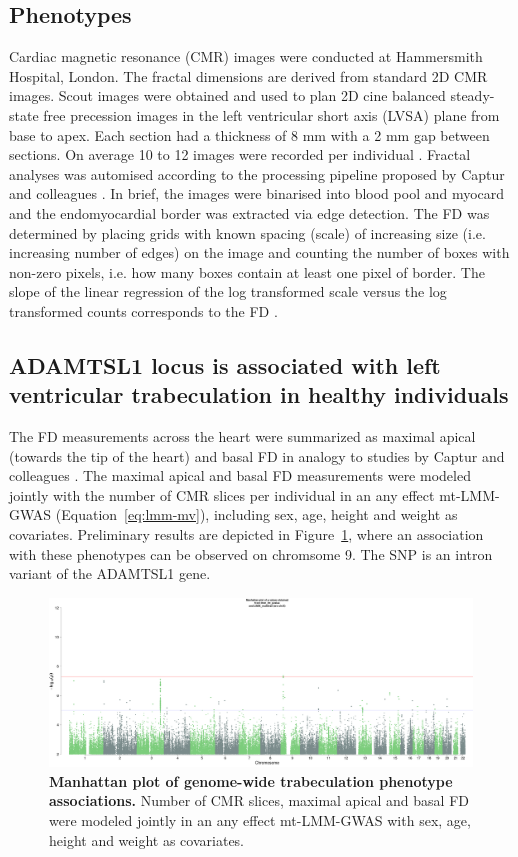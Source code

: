 \subsection{Phenotypes}
Cardiac magnetic resonance (CMR) images were conducted at Hammersmith Hospital, London. The fractal dimensions are derived from standard 2D CMR images. Scout images were obtained and used to plan 2D cine balanced steady-state free precession images in the left ventricular short axis (LVSA) plane from base to apex. Each section had a thickness of 8 mm with a 2 mm gap between sections. On average 10 to 12 images were recorded per individual \citep{DeMarvao2014}. Fractal analyses was automised according to the processing pipeline proposed by Captur and colleagues \citeyearpar{Captur2013}. In brief, the images were binarised into blood pool and myocard and the endomyocardial border was extracted via edge detection. The FD was determined by placing grids with known spacing (scale) of increasing size (i.e. increasing number of edges) on the image and counting the number of boxes with non-zero pixels, i.e. how many boxes contain at least one pixel of border. The slope of the linear regression of the log transformed scale versus the log transformed counts corresponds to the FD \citep{Captur2013}.

\subsection{ADAMTSL1 locus is associated with left ventricular trabeculation in healthy individuals}
The FD measurements across the heart were summarized as maximal apical (towards the tip of the heart) and basal FD in analogy to studies by Captur and colleagues \citeyearpar{Captur2013,Captur2014}. The maximal apical and basal FD measurements were modeled jointly with the number of CMR slices per individual in an any effect mt-LMM-GWAS (Equation~\ref{eq:lmm-mv}), including sex, age, height and weight as covariates. Preliminary results are depicted in Figure~\ref{fig:manhattanFD}, where an association with these phenotypes can be observed on chromsome 9. The SNP is an intron variant of the ADAMTSL1 gene.

\begin{figure}[hbtp]
	\centering
	\includegraphics[trim = 0mm 0mm 0mm 100mm, clip, width=1\textwidth]{Figures/lmm_mt_pvalue_LIMIX_multitrait_manhattanplot.png}
	\caption{\textbf{Manhattan plot of genome-wide trabeculation phenotype associations.} Number of CMR slices, maximal apical and basal FD were modeled jointly in an any effect mt-LMM-GWAS with sex, age, height and weight as covariates.}
 	\label{fig:manhattanFD}
\end{figure}

